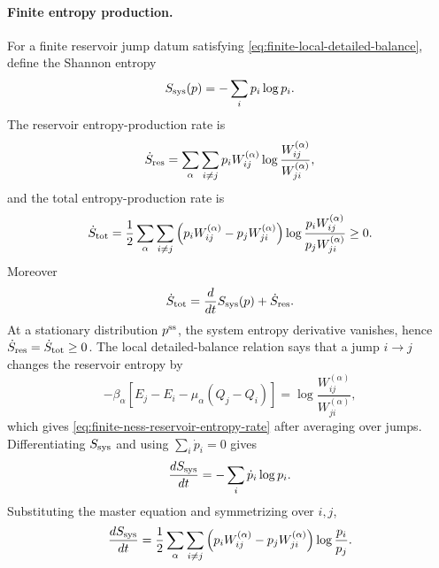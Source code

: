 \paragraph{Finite entropy production.}
For a finite reservoir jump datum satisfying
\eqref{eq:finite-local-detailed-balance}, define the Shannon entropy
\begin{equation}
  S_{\rm sys}(p)=-\sum_i p_i\log p_i .
  \label{eq:finite-ness-system-entropy}
\end{equation}
The reservoir entropy-production rate is
\begin{equation}
  \dot S_{\rm res}
  =
  \sum_{\alpha}\sum_{i\ne j}
  p_iW^{(\alpha)}_{ij}
  \log\frac{W^{(\alpha)}_{ij}}{W^{(\alpha)}_{ji}},
  \label{eq:finite-ness-reservoir-entropy-rate}
\end{equation}
and the total entropy-production rate is
\begin{equation}
  \dot S_{\rm tot}
  =
  \frac12\sum_{\alpha}\sum_{i\ne j}
  \left(
    p_iW^{(\alpha)}_{ij}
    -
    p_jW^{(\alpha)}_{ji}
  \right)
  \log
  \frac{p_iW^{(\alpha)}_{ij}}
       {p_jW^{(\alpha)}_{ji}}
  \ge0 .
  \label{eq:finite-ness-total-entropy-production}
\end{equation}
Moreover
\begin{equation}
  \dot S_{\rm tot}=\frac{d}{dt}S_{\rm sys}(p)+\dot S_{\rm res}.
  \label{eq:finite-ness-system-plus-reservoir}
\end{equation}
At a stationary distribution \(p^{\rm ss}\), the system entropy derivative
vanishes, hence \(\dot S_{\rm res}=\dot S_{\rm tot}\ge0\).
The local detailed-balance relation says that a jump \(i\to j\) changes the
reservoir entropy by
\begin{equation}
  -\beta_\alpha
  \left[
    E_j-E_i-\mu_\alpha(Q_j-Q_i)
  \right]
  =
  \log\frac{W^{(\alpha)}_{ij}}{W^{(\alpha)}_{ji}},
  \label{eq:finite-ness-jump-reservoir-entropy}
\end{equation}
which gives \eqref{eq:finite-ness-reservoir-entropy-rate} after averaging
over jumps.  Differentiating \(S_{\rm sys}\) and using
\(\sum_i\dot p_i=0\) gives
\begin{equation}
  \frac{dS_{\rm sys}}{dt}
  =
  -\sum_i\dot p_i\log p_i .
  \label{eq:finite-ness-system-entropy-derivative}
\end{equation}
Substituting the master equation and symmetrizing over \(i,j\),
\begin{equation}
  \frac{dS_{\rm sys}}{dt}
  =
  \frac12\sum_{\alpha}\sum_{i\ne j}
  \left(
    p_iW^{(\alpha)}_{ij}
    -
    p_jW^{(\alpha)}_{ji}
  \right)
  \log\frac{p_i}{p_j}.
  \label{eq:finite-ness-system-entropy-current-form}
\end{equation}
